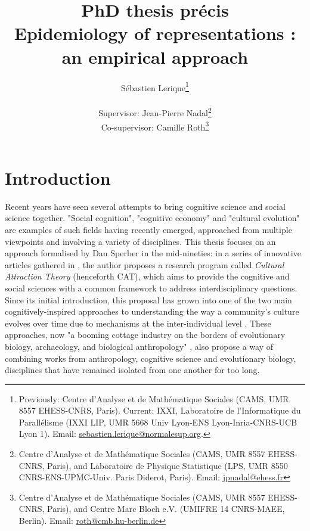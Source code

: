 \documentclass[english,]{article}
\title{\large PhD thesis précis\\
\LARGE Epidemiology of representations :\\
an empirical approach}
\author{Sébastien Lerique\footnote{Previously: Centre d'Analyse et de Mathématique Sociales
  (CAMS, UMR 8557 EHESS-CNRS, Paris).
  Current: IXXI, Laboratoire de l'Informatique du Parallélisme (IXXI LIP, UMR 5668 Univ Lyon-ENS Lyon-Inria-CNRS-UCB Lyon 1).
  Email:
  \hbox{\href{mailto:sebastien.lerique@normalesup.org}{sebastien.lerique@normalesup.org}}.}\\
\hfill \\
Supervisor: Jean-Pierre Nadal\footnote{Centre d'Analyse et de
  Mathématique Sociales (CAMS, UMR 8557 EHESS-CNRS, Paris), and
  Laboratoire de Physique Statistique (LPS, UMR 8550 CNRS-ENS-UPMC-Univ.
  Paris Diderot, Paris). Email:
  \hbox{\href{mailto:jpnadal@ehess.fr}{jpnadal@ehess.fr}}}\\
Co-supervisor: Camille Roth\footnote{Centre d'Analyse et de
  Mathématique Sociales (CAMS, UMR 8557 EHESS-CNRS, Paris), and
  Centre Marc Bloch e.V. (UMIFRE 14 CNRS-MAEE, Berlin). Email:
  \hbox{\href{mailto:roth@cmb.hu-berlin.de}{roth@cmb.hu-berlin.de}}}}
\date{}
\begin{document}
\maketitle


\section{Introduction}
\label{sec:intro}



Recent years have seen several attempts to bring cognitive science and social science together.
"Social cognition", "cognitive economy" and "cultural evolution" are examples of such fields having recently emerged, approached from multiple viewpoints and involving a variety of disciplines.
This thesis focuses on an approach formalised by Dan Sperber in the mid-nineties:
in a series of innovative articles gathered in \autocite{sperber_explaining_1996}, the author proposes a research program called \emph{Cultural Attraction Theory} (henceforth CAT), which aims to provide the cognitive and social sciences with a common framework to address interdisciplinary questions.
Since its initial introduction, this proposal has grown into one of the two main cognitively-inspired approaches to understanding the way a community's culture evolves over time due to mechanisms at the inter-individual level \autocites[the other approach being Standard Cultural Evolution,][]{cavalli-sforza_cultural_1981,boyd_culture_1985}.
These approaches, now "a booming cottage industry on the borders of evolutionary biology, archaeology, and biological anthropology" \autocite{sterelny_cultural_2017}, also propose a way of combining works from anthropology, cognitive science and evolutionary biology, disciplines that have remained isolated from one another for too long.
\end{document}
